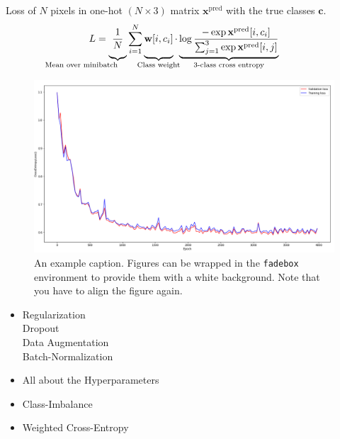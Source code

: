 \documentclass[
]{dtuposter}
\begin{document}
\begin{dtupostercontent}
Loss of \(N\) pixels in one-hot \((N \times  3)\) matrix \(\mathbf x^\text{pred}\) with the true classes \(\mathbf c\).
\[
L = \underbrace{
\vphantom{\sum_{i}}
\frac 1 N}
_{\mathllap{\text{Mean over minibatch}}}
\sum_{\mathclap {i=1}}^{N}
\underbrace{ 
\vphantom{\sum_{i}}
\mathbf{w}[i, c_i]}
_{\mathclap{\text{Class weight}}}  
\cdot 
\underbrace{
\log 
\frac
{-\exp\mathbf x^\text{pred}[i, c_i]}
{\sum_{j=1}^{3}\exp\mathbf x^\text{pred}[i, j]}
}_{\mathclap{\text{3-class cross entropy}}}
\]
\begin{figure}
	\begin{center}
			\includegraphics[width=\linewidth,origin=c]{loss}
	\end{center}
	\caption{An example caption. Figures can be wrapped in the \texttt{fadebox} 
		environment to provide them with a white background. Note that you have to align the 
		figure again.}\label{fig:example2}
\end{figure}


\begin{itemize}
	\item Regularization \\
		Dropout \\
		Data Augmentation \\
		Batch-Normalization
	
	\item All about the Hyperparameters
\end{itemize}

\begin{itemize}
	\item Class-Imbalance
	\item Weighted Cross-Entropy
	

\end{itemize}
\end{dtupostercontent}
\end{document}
